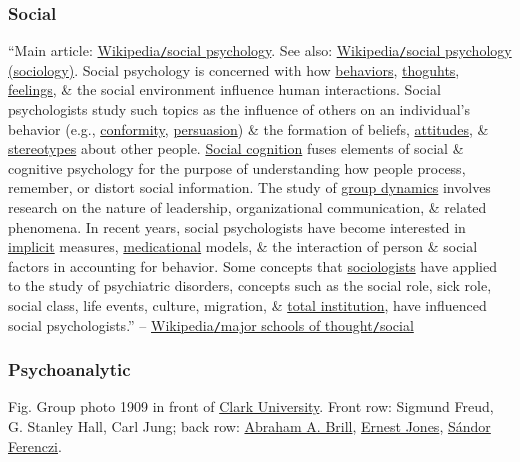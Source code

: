 \documentclass[oneside]{book}
\numberwithin{equation}{section}
\begin{document}
\subsubsection{Social}
``Main article: \href{https://en.wikipedia.org/wiki/Social_psychology}{Wikipedia\texttt{/}social psychology}. See also: \href{https://en.wikipedia.org/wiki/Social_psychology_(sociology)}{Wikipedia\texttt{/}social psychology (sociology)}. Social psychology is concerned with how \href{https://en.wikipedia.org/wiki/Behavior}{behaviors}, \href{https://en.wikipedia.org/wiki/Thought}{thoguhts}, \href{https://en.wikipedia.org/wiki/Feeling}{feelings}, \& the social environment influence human interactions. Social psychologists study such topics as the influence of others on an individual's behavior (e.g., \href{https://en.wikipedia.org/wiki/Conformity_(psychology)}{conformity}, \href{https://en.wikipedia.org/wiki/Persuasion}{persuasion}) \& the formation of beliefs, \href{https://en.wikipedia.org/wiki/Attitude_(psychology)}{attitudes}, \& \href{https://en.wikipedia.org/wiki/Stereotype}{stereotypes} about other people. \href{https://en.wikipedia.org/wiki/Social_cognition}{Social cognition} fuses elements of social \& cognitive psychology for the purpose of understanding how people process, remember, or distort social information. The study of \href{https://en.wikipedia.org/wiki/Group_dynamics}{group dynamics} involves research on the nature of leadership, organizational communication, \& related phenomena. In recent years, social psychologists have become interested in \href{https://en.wikipedia.org/wiki/Implicit_Association_Test}{implicit} measures, \href{https://en.wikipedia.org/wiki/Mediation_(statistics)}{medicational} models, \& the interaction of person \& social factors in accounting for behavior. Some concepts that \href{https://en.wikipedia.org/wiki/Sociology}{sociologists} have applied to the study of psychiatric disorders, concepts such as the social role, sick role, social class, life events, culture, migration, \& \href{https://en.wikipedia.org/wiki/Total_institution}{total institution}, have influenced social psychologists.'' -- \href{https://en.wikipedia.org/wiki/Psychology#Social}{Wikipedia\texttt{/}major schools of thought\texttt{/}social}

\subsubsection{Psychoanalytic}
\textsf{Fig. Group photo 1909 in front of \href{https://en.wikipedia.org/wiki/Clark_University}{Clark University}. Front row: Sigmund Freud, G. Stanley Hall, Carl Jung; back row: \href{https://en.wikipedia.org/wiki/Abraham_A._Brill}{Abraham A. Brill}, \href{https://en.wikipedia.org/wiki/Ernest_Jones}{Ernest Jones}, \href{https://en.wikipedia.org/wiki/Sandor_Ferenczi}{S\'andor Ferenczi}.}
\end{document}
